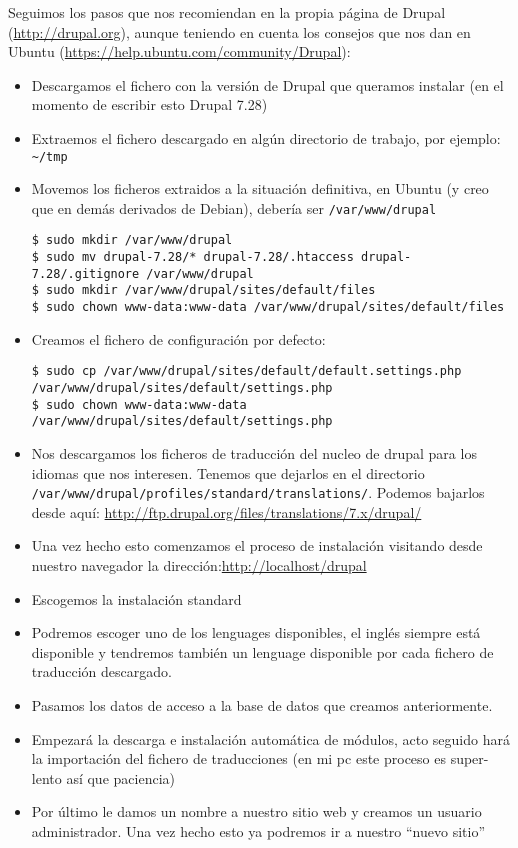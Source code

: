 Seguimos los pasos que nos recomiendan en la propia página de Drupal
(\url{http://drupal.org}), aunque teniendo en cuenta los consejos que
nos dan en Ubuntu (\url{https://help.ubuntu.com/community/Drupal}):

\begin{itemize}
\item
  Descargamos el fichero con la versión de Drupal que queramos instalar
  (en el momento de escribir esto Drupal 7.28)
\item
  Extraemos el fichero descargado en algún directorio de trabajo, por
  ejemplo: \texttt{\textasciitilde{}/tmp}
\item
  Movemos los ficheros extraidos a la situación definitiva, en Ubuntu (y
  creo que en demás derivados de Debian), debería ser
  \texttt{/var/www/drupal}

\begin{verbatim}
$ sudo mkdir /var/www/drupal
$ sudo mv drupal-7.28/* drupal-7.28/.htaccess drupal-7.28/.gitignore /var/www/drupal
$ sudo mkdir /var/www/drupal/sites/default/files
$ sudo chown www-data:www-data /var/www/drupal/sites/default/files
\end{verbatim}
\item
  Creamos el fichero de configuración por defecto:

\begin{verbatim}
$ sudo cp /var/www/drupal/sites/default/default.settings.php /var/www/drupal/sites/default/settings.php
$ sudo chown www-data:www-data /var/www/drupal/sites/default/settings.php
\end{verbatim}
\item
  Nos descargamos los ficheros de traducción del nucleo de drupal para
  los idiomas que nos interesen. Tenemos que dejarlos en el directorio
  \texttt{/var/www/drupal/profiles/standard/translations/}. Podemos
  bajarlos desde aquí:
  \url{http://ftp.drupal.org/files/translations/7.x/drupal/}
\item
  Una vez hecho esto comenzamos el proceso de instalación visitando
  desde nuestro navegador la dirección:\url{http://localhost/drupal}
\item
  Escogemos la instalación standard
\item
  Podremos escoger uno de los lenguages disponibles, el inglés siempre
  está disponible y tendremos también un lenguage disponible por cada
  fichero de traducción descargado.
\item
  Pasamos los datos de acceso a la base de datos que creamos
  anteriormente.
\item
  Empezará la descarga e instalación automática de módulos, acto seguido
  hará la importación del fichero de traducciones (en mi pc este proceso
  es super-lento así que paciencia)
\item
  Por último le damos un nombre a nuestro sitio web y creamos un usuario
  administrador. Una vez hecho esto ya podremos ir a nuestro ``nuevo
  sitio''
\end{itemize}

